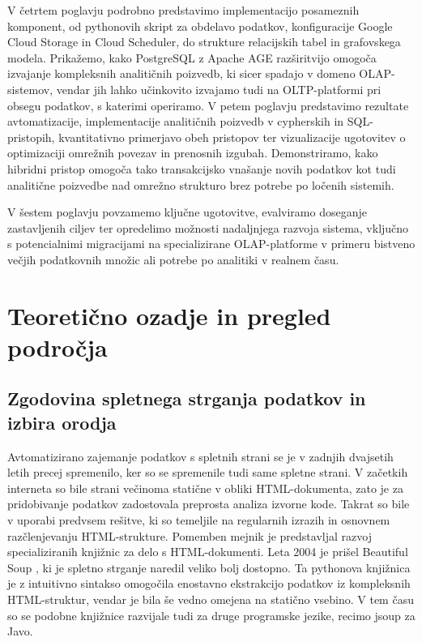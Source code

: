 \documentclass[a4paper,12pt,openright]{book}
\begin{document}
V četrtem poglavju podrobno predstavimo implementacijo posameznih komponent, od pythonovih skript za obdelavo podatkov, konfiguracije Google Cloud Storage in Cloud Scheduler, do strukture relacijskih tabel in grafovskega modela. Prikažemo, kako PostgreSQL z Apache AGE razširitvijo omogoča izvajanje kompleksnih analitičnih poizvedb, ki sicer spadajo v domeno OLAP-sistemov, vendar jih lahko učinkovito izvajamo tudi na OLTP-platformi pri obsegu podatkov, s katerimi operiramo. V petem poglavju predstavimo rezultate avtomatizacije, implementacije analitičnih poizvedb v cypherskih in SQL-pristopih, kvantitativno primerjavo obeh pristopov ter vizualizacije ugotovitev o optimizaciji omrežnih povezav in prenosnih izgubah. Demonstriramo, kako hibridni pristop omogoča tako transakcijsko vnašanje novih podatkov kot tudi analitične poizvedbe nad omrežno strukturo brez potrebe po ločenih sistemih.

V šestem poglavju povzamemo ključne ugotovitve, evalviramo doseganje zastavljenih ciljev ter opredelimo možnosti nadaljnjega razvoja sistema, vključno s potencialnimi migracijami na specializirane OLAP-platforme v primeru bistveno večjih podatkovnih množic ali potrebe po analitiki v realnem času.

\chapter{Teoretično ozadje in pregled področja}
\label{ch:teoreticno}

\section{Zgodovina spletnega strganja podatkov in izbira orodja}
Avtomatizirano zajemanje podatkov s spletnih strani se je v zadnjih dvajsetih letih precej spremenilo, ker so se spremenile tudi same spletne strani. V začetkih interneta so bile strani večinoma statične v obliki HTML-dokumenta, zato je za pridobivanje podatkov zadostovala preprosta analiza izvorne kode. Takrat so bile v uporabi predvsem rešitve, ki so temeljile na regularnih izrazih in osnovnem razčlenjevanju HTML-strukture.
Pomemben mejnik je predstavljal razvoj specializiranih knjižnic za delo s HTML-dokumenti. Leta 2004 je prišel Beautiful Soup \cite{beautifulsoup4}, ki je spletno strganje naredil veliko bolj dostopno. Ta pythonova knjižnica je z intuitivno sintakso omogočila enostavno ekstrakcijo podatkov iz kompleksnih HTML-struktur, vendar je bila še vedno omejena na statično vsebino. V tem času so se podobne knjižnice razvijale tudi za druge programske jezike, recimo jsoup \cite{jsoup} za Javo.
\end{document}
